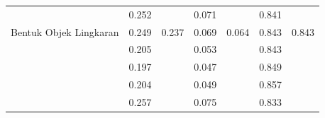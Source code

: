 \begin{table}[]
\begin{tabular}{|l|cc|cc|cc|}
                                                      & \multicolumn{1}{c|}{\cellcolor[HTML]{FFFFFF}0.252} & \cellcolor[HTML]{FFFFFF}                         & \multicolumn{1}{c|}{\cellcolor[HTML]{FFFFFF}0.071} & \cellcolor[HTML]{FFFFFF}                           & \multicolumn{1}{c|}{\cellcolor[HTML]{FFFFFF}0.841} & \cellcolor[HTML]{FFFFFF}                        \\ \cline{2-2} \cline{4-4} \cline{6-6}
  \multirow{-5}{*}{Bentuk Objek Lingkaran} & \multicolumn{1}{c|}{\cellcolor[HTML]{FFFFFF}0.249} & \multirow{-5}{*}{\cellcolor[HTML]{FFFFFF}0.237} & \multicolumn{1}{c|}{\cellcolor[HTML]{FFFFFF}0.069} & \multirow{-5}{*}{\cellcolor[HTML]{FFFFFF}0.064} & \multicolumn{1}{c|}{\cellcolor[HTML]{FFFFFF}0.843} & \multirow{-5}{*}{\cellcolor[HTML]{FFFFFF}0.843} \\ \hline
                                                      & \multicolumn{1}{c|}{\cellcolor[HTML]{FFFFFF}0.205} & \cellcolor[HTML]{FFFFFF}                         & \multicolumn{1}{c|}{\cellcolor[HTML]{FFFFFF}0.053} & \cellcolor[HTML]{FFFFFF}                           & \multicolumn{1}{c|}{\cellcolor[HTML]{FFFFFF}0.843} & \cellcolor[HTML]{FFFFFF}                        \\ \cline{2-2} \cline{4-4} \cline{6-6}
                                                      & \multicolumn{1}{c|}{\cellcolor[HTML]{FFFFFF}0.197} & \cellcolor[HTML]{FFFFFF}                         & \multicolumn{1}{c|}{\cellcolor[HTML]{FFFFFF}0.047} & \cellcolor[HTML]{FFFFFF}                           & \multicolumn{1}{c|}{\cellcolor[HTML]{FFFFFF}0.849} & \cellcolor[HTML]{FFFFFF}                        \\ \cline{2-2} \cline{4-4} \cline{6-6}
                                                      & \multicolumn{1}{c|}{\cellcolor[HTML]{FFFFFF}0.204} & \cellcolor[HTML]{FFFFFF}                         & \multicolumn{1}{c|}{\cellcolor[HTML]{FFFFFF}0.049}  & \cellcolor[HTML]{FFFFFF}                           & \multicolumn{1}{c|}{\cellcolor[HTML]{FFFFFF}0.857} & \cellcolor[HTML]{FFFFFF}                        \\ \cline{2-2} \cline{4-4} \cline{6-6}
                                                      & \multicolumn{1}{c|}{\cellcolor[HTML]{FFFFFF}0.257} & \cellcolor[HTML]{FFFFFF}                         & \multicolumn{1}{c|}{\cellcolor[HTML]{FFFFFF}0.075} & \cellcolor[HTML]{FFFFFF}                           & \multicolumn{1}{c|}{\cellcolor[HTML]{FFFFFF}0.833} & \cellcolor[HTML]{FFFFFF}                        \\ \cline{2-2} \cline{4-4} \cline{6-6}

\end{tabular}
\end{table}
